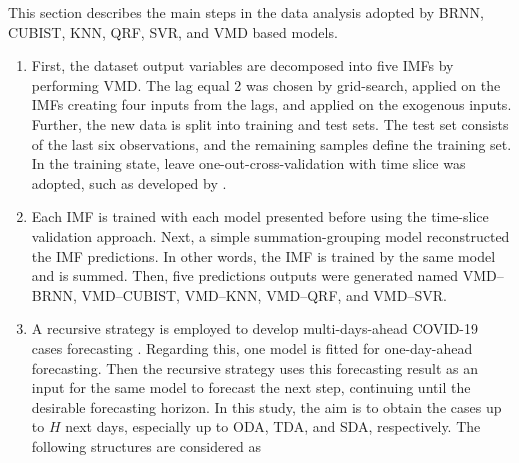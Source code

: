 This section describes the main steps in the data analysis adopted by \ac{BRNN}, \ac{CUBIST}, \ac{KNN}, \ac{QRF}, \ac{SVR}, and \ac{VMD} based models. 

\begin{enumerate}[start=1,label={\textbf{Step \arabic*:}},wide = 0pt, leftmargin = 3em]
\item \label{step1} First, the dataset output variables are decomposed into five \ac{IMF}s by performing \ac{VMD}. The lag equal 2 was chosen by grid-search, applied on the \ac{IMF}s creating four inputs from the lags, and applied on the exogenous inputs. Further, the new data is split into training and test sets. The test set consists of the last six observations, and the remaining samples define the training set. In the training state, leave one-out-cross-validation with time slice was adopted, such as developed by .

\item \label{step2} Each \ac{IMF} is trained with each model presented before using the time-slice validation approach. Next, a simple summation-grouping model reconstructed the \ac{IMF} predictions. In other words, the \ac{IMF} is trained by the same model and is summed. Then, five predictions outputs were generated named \ac{VMD}--\ac{BRNN}, \ac{VMD}--\ac{CUBIST}, \ac{VMD}--\ac{KNN}, \ac{VMD}--\ac{QRF}, and \ac{VMD}--\ac{SVR}.

\item \label{step3} A recursive strategy is employed to develop multi-days-ahead \ac{COVID-19} cases forecasting \cite{ribeiro2020Shortterm}. Regarding this, one model is fitted for one-day-ahead forecasting. Then the recursive strategy uses this forecasting result as an input for the same model to forecast the next step, continuing until the desirable forecasting horizon. In this study, the aim is to obtain the cases up to $H$ next days, especially up to \ac{ODA}, \ac{TDA}, and \ac{SDA}, respectively. The following structures are considered as


\end{enumerate}
